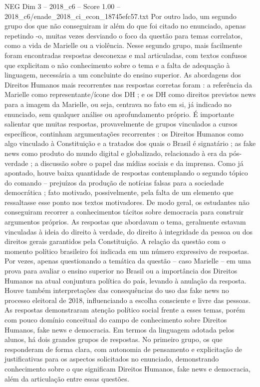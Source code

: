 \begin{textsample}{NEG Dim 3 – 2018\_c6 – Score 1.00 – 2018\_c6/enade\_2018\_ci\_econ\_18745efc57.txt}
Por outro lado, um segundo grupo dos que não conseguiram ir além do que foi citado no enunciado, apenas repetindo -o, muitas vezes desviando o foco da questão para temas correlatos, como a vida de Marielle ou a violência.
Nesse segundo grupo, mais facilmente foram encontradas respostas desconexas e mal articuladas, com textos confusos que explicitam o não conhecimento sobre o tema e a falta de adequação à linguagem, necessária a um concluinte do ensino superior.
As abordagens dos Direitos Humanos mais recorrentes nas respostas corretas foram : a referência da Marielle como representante/ícone dos DH ; e os DH como direitos previstos news para a imagem da Marielle, ou seja, centrava no fato em si, já indicado no enunciado, sem qualquer análise ou aprofundamento próprio.
É importante salientar que muitas respostas, provavelmente de grupos vinculados a cursos específicos, continham argumentações recorrentes : os Direitos Humanos como algo vinculado à Constituição e a tratados dos quais o Brasil é signatário ; as fake news como produto do mundo digital e globalizado, relacionado à era da pós-verdade ; a discussão sobre o papel das mídias sociais e da imprensa.
Como já apontado, houve baixa quantidade de respostas contemplando o segundo tópico do comando – prejuízos da produção de notícias falsas para a sociedade democrática ; fato motivado, possivelmente, pela falta de um elemento que ressaltasse esse ponto nos textos motivadores.
De modo geral, os estudantes não conseguiram recorrer a conhecimentos tácitos sobre democracia para construir argumentos próprios.
As respostas que abordavam o tema, geralmente estavam vinculadas à ideia do direito à verdade, do direito à integridade da pessoa ou dos direitos gerais garantidos pela Constituição.
A relação da questão com o momento político brasileiro foi indicada em um número expressivo de respostas.
Por vezes, apenas questionando a temática da questão – caso Marielle – em uma prova para avaliar o ensino superior no Brasil ou a importância dos Direitos Humanos na atual conjuntura política do país, levando à anulação da resposta.
Houve também interpretações das consequências do uso das fake news no processo eleitoral de 2018, influenciando a escolha consciente e livre das pessoas.
As respostas demonstraram atenção político social frente a esses temas, porém com pouco domínio conceitual do campo de conhecimento sobre Direitos Humanos, fake news e democracia.
Em termos da linguagem adotada pelos alunos, há dois grandes grupos de respostas.
No primeiro grupo, os que responderam de forma clara, com autonomia de pensamento e explicitação de justificativas para os aspectos solicitados no enunciado, demonstrando conhecimento sobre o que significam Direitos Humanos, fake news e democracia, além da articulação entre essas questões.

\end{textsample}
